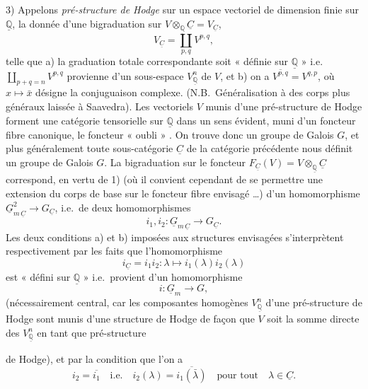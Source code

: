 \documentclass[11pt,a4paper]{article}
\begin{document}
3) Appelons \emph{pré-structure de Hodge} sur un espace vectoriel  de
dimension finie sur $\underline{\mathbb{Q}}$, la donnée d'une bigraduation sur
$V \otimes_{\underline{\mathbb{Q}}} \underline{C} = V_{\underline{C}}$,
\[
V_{\underline{C}} = \coprod_{p,q} V^{p,q} ,
\]
telle que a) la graduation totale correspondante soit « définie sur
$\underline{\mathbb{Q}}$ » i.e.\ $\coprod_{p+q=n} V^{p,q}$ provienne d'un
sous-espace $V_{\underline{\mathbb{Q}}}^{n}$ de $V$, et b) on a
$\overline{V^{p,q}} = V^{q,p}$, où $x \mapsto \bar{x}$ désigne la
conjuguaison complexe. (N.B.\ Généralisation à des corps plus généraux laissée
à Saavedra). Les vectoriels $V$ munis d'une pré-structure de Hodge forment une
catégorie tensorielle sur $\underline{\mathbb{Q}}$ dans un sens évident, muni
d'un foncteur fibre canonique, le foncteur « oubli » . On trouve donc
un groupe de Galois $G$, et plus généralement toute \add{$\otimes$-}sous-catégorie
$\underline{C}$ de la catégorie précédente nous définit un groupe de Galois
$G$. La bigraduation sur le foncteur
$F_{\underline{C}}(V) = V \otimes_{\underline{\mathbb{Q}}} \underline{C}$
correspond, en vertu de 1) (où il convient cependant de se permettre une
extension du corps de base sur le foncteur fibre envisagé …) d'un
homomorphisme
$\underline{G}_{m\,\underline{C}}^{2} \to G_{\underline{C}}$, i.e.\ de deux
homomorphismes 
\[
i_{1}, i_{2} : \underline{G}_{m\,\underline{C}} \longrightarrow G_{\underline{C}} .
\]
Les deux conditions a) et b) imposées aux structures envisagées
s'interprètent respectivement par les faits que l'homomorphisme
\[
i_{\underline{C}} = i_{1} i_{2} : \lambda \mapsto i_{1}(\lambda) i_{2}(\lambda)
\]
est « défini sur $\underline{\mathbb{Q}}$ » i.e.\ provient d'un homomorphisme
\[
i : \underline{G}_{m} \longrightarrow G ,
\]
(nécessairement central, car les composantes homogènes
$V_{\underline{\mathbb{Q}}}^{n}$ d'une pré-structure de Hodge sont
  munis d'une structure de
Hodge de façon que $V$ soit la somme directe des
$V_{\underline{\mathbb{Q}}}^{n}$ en tant que pré-structure

de Hodge), et par la condition que l'on a
\[
i_{2} = \overline{i_{1}} \quad \text{i.e.} \quad
i_{2}(\lambda) = \overline{i_{1}(\bar{\lambda})} \quad \text{pour tout}\quad
\lambda \in \underline{C} .
\]
\end{document}
